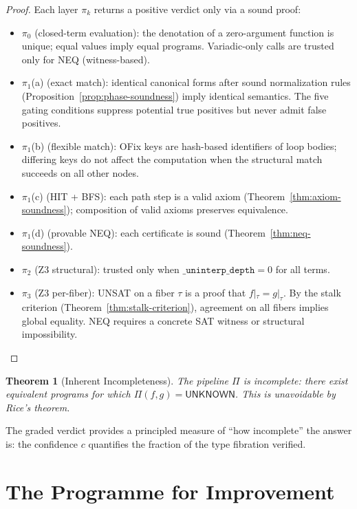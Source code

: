 \documentclass[11pt,a4paper]{report}
\theoremstyle{definition}
\theoremstyle{plain}
\newtheorem{theorem}[definition]{Theorem}
\begin{document}
\begin{proof}
Each layer $\pi_k$ returns a positive verdict only via a sound
proof:
\begin{itemize}
  \item $\pi_0$ (closed-term evaluation): the denotation of a
    zero-argument function is unique; equal values imply equal
    programs.  Variadic-only calls are trusted only for NEQ
    (witness-based).
  \item $\pi_1$(a) (exact match): identical canonical forms after
    sound normalization rules (Proposition~\ref{prop:phase-soundness})
    imply identical semantics.  The five gating conditions suppress
    potential true positives but never admit false positives.
  \item $\pi_1$(b) (flexible match): OFix keys are hash-based
    identifiers of loop bodies; differing keys do not affect the
    computation when the structural match succeeds on all other
    nodes.
  \item $\pi_1$(c) (HIT + BFS): each path step is a valid axiom
    (Theorem~\ref{thm:axiom-soundness}); composition of valid
    axioms preserves equivalence.
  \item $\pi_1$(d) (provable NEQ): each certificate is sound
    (Theorem~\ref{thm:neq-soundness}).
  \item $\pi_2$ (Z3 structural): trusted only when
    $\texttt{\_uninterp\_depth} = 0$ for all terms.
  \item $\pi_3$ (Z3 per-fiber): UNSAT on a fiber $\tau$ is a proof
    that $f|_\tau = g|_\tau$.  By the stalk criterion
    (Theorem~\ref{thm:stalk-criterion}), agreement on all fibers
    implies global equality.  NEQ requires a concrete SAT witness
    or structural impossibility.
\end{itemize}
\end{proof}

\begin{theorem}[Inherent Incompleteness]
\label{thm:incompleteness}
The pipeline $\Pi$ is \emph{incomplete}: there exist equivalent
programs for which $\Pi(f,g) = \mathsf{UNKNOWN}$.  This is
unavoidable by Rice's theorem.
\end{theorem}

The graded verdict provides a principled measure of ``how
incomplete'' the answer is: the confidence $c$ quantifies
the fraction of the type fibration verified.


\section{The Programme for Improvement}
\label{sec:programme}
\end{document}
